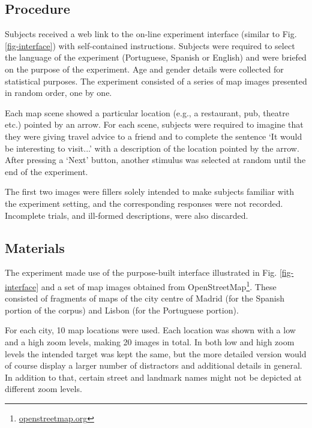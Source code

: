 \documentclass{article}
\begin{document}
\subsection{Procedure}

Subjects received a web link to the on-line experiment interface (similar to Fig. \ref{fig-interface}) with self-contained instructions. Subjects were required to select the language of the experiment (Portuguese, Spanish or English) and were briefed on the purpose of the experiment. Age and gender details were collected for statistical purposes. The experiment consisted of a series of map images presented in random order, one by one. 

Each map scene showed a particular location (e.g., a restaurant, pub, theatre etc.) pointed by an arrow. For each scene, subjects were required to imagine that they were giving travel advice to a friend and to complete the sentence `It would be interesting to visit...' with a description of the location pointed by the arrow. After pressing a `Next' button, another stimulus was selected at random until the end of the experiment. 

The first two images were fillers solely intended to make subjects familiar with the experiment setting, and the corresponding responses were not recorded. Incomplete trials, and ill-formed descriptions, were also discarded. 



\subsection{Materials}

The experiment made use of the purpose-built interface illustrated in Fig. \ref{fig-interface} and a set of map images obtained from OpenStreetMap\footnote{\url{openstreetmap.org}}. These consisted of fragments of maps of the city centre of Madrid (for the Spanish portion of the corpus) and Lisbon (for the Portuguese portion). 

For each city, 10 map locations were used. Each location was shown with a low and a high zoom levels, making 20 images in total. In both low and high zoom levels  the intended target was kept the same, but the more detailed version would of course display a larger number of distractors and additional details in general. In addition to that, certain street and landmark names might not be depicted at different zoom levels.
\end{document}
